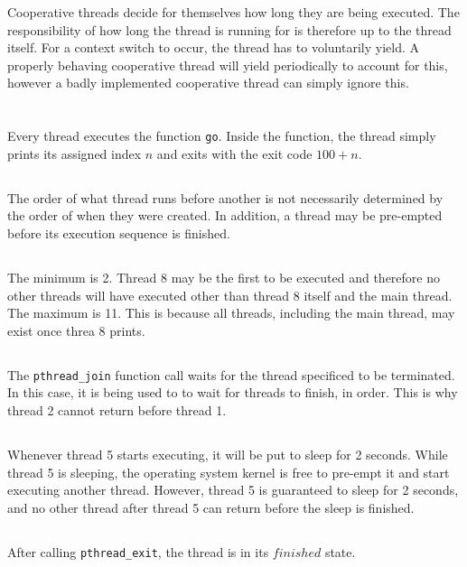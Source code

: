 \documentclass{article}
\begin{document}
Cooperative threads decide for themselves how long they are being executed. The responsibility of how long the thread is running for is therefore up to the thread itself. For a context switch to occur, the thread has to voluntarily yield. A properly behaving cooperative thread will yield periodically to account for this, however a badly implemented cooperative thread can simply ignore this.

\section{}
\subsection{}
Every thread executes the function \texttt{go}. Inside the function, the thread simply prints its assigned index $n$ and exits with the exit code $100 + n$.

\subsection{}
The order of what thread runs before another is not necessarily determined by the order of when they were created. In addition, a thread may be pre-empted before its execution sequence is finished.

\subsection{}
The minimum is 2. Thread 8 may be the first to be executed and therefore no other threads will have executed other than thread 8 itself and the main thread. The maximum is 11. This is because all threads, including the main thread, may exist once threa 8 prints.

\subsection{}
The \texttt{pthread_join} function call waits for the thread specificed to be terminated. In this case, it is being used to to wait for threads to finish, in order. This is why thread 2 cannot return before thread 1.

\subsection{}
Whenever thread 5 starts executing, it will be put to sleep for 2 seconds. While thread 5 is sleeping, the operating system kernel is free to pre-empt it and start executing another thread. However, thread 5 is guaranteed to sleep for 2 seconds, and no other thread after thread 5 can return before the sleep is finished.

\subsection{}
After calling \texttt{pthread_exit}, the thread is in its $finished$ state.
\end{document}
